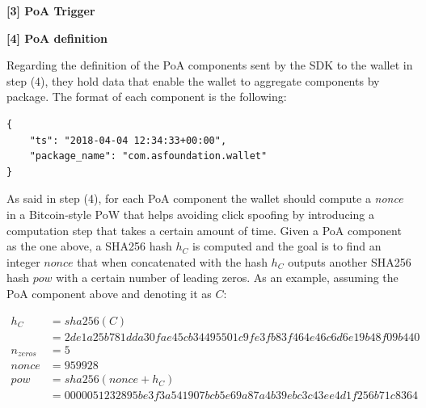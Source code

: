 {\bf [3] PoA Trigger}



\medskip

{\bf [4] PoA definition}

Regarding the definition of the \textsf{PoA} components sent by the SDK to the wallet in step \textsf{(4)}, they hold data that enable the wallet to aggregate components by package. The format of each component is the following:
\begin{tcolorbox}[enhanced jigsaw,sharp corners, drop fuzzy shadow=ShadowColor]
\begin{lstlisting}[xleftmargin=0.05\textwidth]
{
    "ts": "2018-04-04 12:34:33+00:00",
    "package_name": "com.asfoundation.wallet"
}
\end{lstlisting}
\end{tcolorbox}

As said in step \textsf{(4)}, for each \textsf{PoA} component the wallet should compute a \textit{nonce} in a Bitcoin-style \textsf{PoW} that helps avoiding click spoofing by introducing a computation step that takes a certain amount of time. Given a \textsf{PoA} component as the one above, a \textsf{SHA256} hash $h_C$ is computed and the goal is to find an integer $nonce$ that when concatenated with the hash $h_C$ outputs another \textsf{SHA256} hash $pow$ with a certain number of leading zeros. As an example, assuming the \textsf{PoA} component above and denoting it as $C$:
\begin{tcolorbox}[enhanced jigsaw,sharp corners, drop fuzzy shadow=ShadowColor]
\begin{align*}
h_C &= sha256(C) \\
	    &= 2de1a25b781dda30fae45cb34495501c9fe3fb83f464e46c6d6e19b48f09b440 \\
n_{zeros} &= 5 \\
nonce &= 959928 \\
pow &= sha256(nonce + h_C) \\
		       &= 0000051232895be3f3a541907bcb5e69a87a4b39ebc3c43ee4d1f256b71c8364
\end{align*}
\end{tcolorbox}

